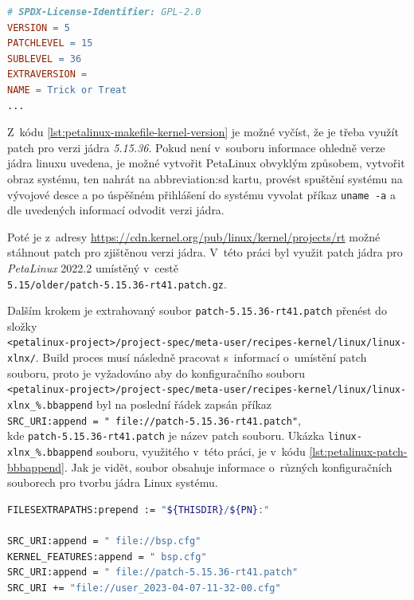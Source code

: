 \documentclass[a4paper, twoside, 11pt]{article}
\begin{document}
				\begin{lstlisting}[language={make}, caption={Významná část Makefile souboru pro určení verze jádra PetaLinux systému.}, label= {lst:petalinux-makefile-kernel-version}]
# SPDX-License-Identifier: GPL-2.0
VERSION = 5
PATCHLEVEL = 15
SUBLEVEL = 36
EXTRAVERSION =
NAME = Trick or Treat
...\end{lstlisting}
				
				Z~kódu \ref{lst:petalinux-makefile-kernel-version} je možné vyčíst, že je třeba využít patch pro verzi jádra \textit{5.15.36}. Pokud není v~souboru informace ohledně verze jádra linuxu uvedena, je možné vytvořit PetaLinux obvyklým způsobem, vytvořit obraz systému, ten nahrát na \gls{abbreviation:sd} kartu, provést spuštění systému na vývojové desce a po úspěšném přihlášení do systému vyvolat příkaz \texttt{uname -a} a dle uvedených informací odvodit verzi jádra.\par
				Poté je z~adresy \href{https://cdn.kernel.org/pub/linux/kernel/projects/rt}{\textcolor{ctublue}{https://cdn.kernel.org/pub/linux/kernel/projects/rt}} možné stáhnout patch pro zjištěnou verzi jádra. V~této práci byl využit patch jádra pro \textit{PetaLinux} 2022.2 umístěný v~cestě\\\texttt{5.15/older/patch-5.15.36-rt41.patch.gz}.\par
				Dalším krokem je extrahovaný soubor \texttt{patch-5.15.36-rt41.patch} přenést do složky\\\texttt{<petalinux-project>/project-spec/meta-user/recipes-kernel/linux/linux-xlnx/}. Build proces musí následně pracovat s~informací o~umístění patch souboru, proto je vyžadováno aby do konfiguračního souboru\\\texttt{<petalinux-project>/project-spec/meta-user/recipes-kernel/linux/linux-xlnx\_\%.bbappend} byl na poslední řádek zapsán příkaz\\\texttt{SRC\_URI:append = " file://patch-5.15.36-rt41.patch"},\\kde \texttt{patch-5.15.36-rt41.patch} je název patch souboru. Ukázka \texttt{linux-xlnx\_\%.bbappend} souboru, využitého v~této práci, je v~kódu \ref{lst:petalinux-patch-bbbappend}. Jak je vidět, soubor obsahuje informace o~různých konfiguračních souborech pro tvorbu jádra Linux systému.

				\begin{lstlisting}[language={sh}, caption={Ukázka konfiguračního souboru pro aplikování Linux patch souboru.}, label= {lst:petalinux-patch-bbbappend}]
FILESEXTRAPATHS:prepend := "${THISDIR}/${PN}:"

SRC_URI:append = " file://bsp.cfg"
KERNEL_FEATURES:append = " bsp.cfg"
SRC_URI:append = " file://patch-5.15.36-rt41.patch"
SRC_URI += "file://user_2023-04-07-11-32-00.cfg"\end{lstlisting}
\end{document}

